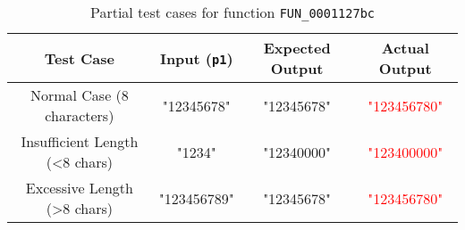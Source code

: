 \documentclass[acmsmall,screen,review,anonymous]{acmart} %
\begin{document}
\begin{table}[h]
    \centering
    \caption{Partial test cases for function \lstinline{FUN_0001127bc}} %
    \label{tab:test_cases}
    \begin{tabular}{cccc}
        \toprule
        \textbf{Test Case} & \textbf{Input (\texttt{p1})} & \textbf{Expected Output} & \textbf{Actual Output} \\
        \midrule
        Normal Case (8 characters)      & "12345678"  & "12345678" & \textcolor{red}{"123456780"} \\
        Insufficient Length (<8 chars)  & "1234"      & "12340000" & \textcolor{red}{"123400000"} \\
        Excessive Length (>8 chars)     & "123456789" & "12345678" & \textcolor{red}{"123456780"} \\
        \bottomrule
    \end{tabular}
\end{table}




\end{document}
